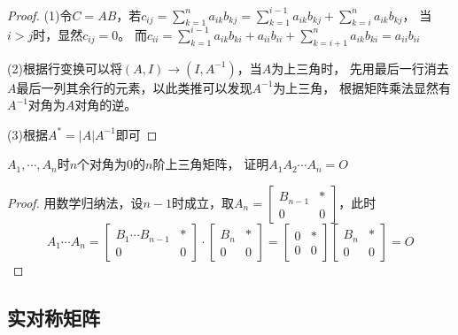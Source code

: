 \begin{proof}
  (1)令$C = AB$，若$c_{ij} = \sum\limits_{k = 1}^n a_{ik}b_{kj} = \sum\limits_{k = 1}^{i-1}a_{ik}b_{kj} + \sum\limits_{k = i}^n a_{ik}b_{kj}$，
  当$i > j$时，显然$c_{ij} = 0$。
  而$c_{ii} = \sum\limits_{k = 1}^{i-1}a_{ik}b_{ki} + a_{ii}b_{ii} + \sum\limits_{k = i+1}^na_{ik}b_{ki} = a_{ii}b_{ii}$

  (2)根据行变换可以将$(A,I) \rightarrow (I,A^{-1})$，当$A$为上三角时，
  先用最后一行消去$A$最后一列其余行的元素，以此类推可以发现$A^{-1}$为上三角，
  根据矩阵乘法显然有$A^{-1}$对角为$A$对角的逆。

  (3)根据$A^{\ast} = |A| A^{-1}$即可
\end{proof}

\begin{theorem}[n个上三角矩阵的乘积]
  $A_1,\cdots,A_n$时$n$个对角为$0$的$n$阶上三角矩阵，
  证明$A_1A_2\cdots A_n = O$
\end{theorem}

\begin{proof}
  用数学归纳法，设$n-1$时成立，取$A_n = \left[
    \begin{array}{cc}
      B_{n-1}&*\\
      0&0
    \end{array}
  \right]$，此时
  \begin{equation*}
    A_1\cdots A_n = \left[
      \begin{array}{cc}
        B_1\cdots B_{n-1}&*\\
        0&0
      \end{array}
    \right] \cdot \left[
      \begin{array}{cc}
        B_n&*\\
        0&0
      \end{array}
    \right] = \left[
      \begin{array}{cc}
        0&*\\
        0&0
      \end{array}
    \right] \left[
      \begin{array}{cc}
        B_n&*\\
        0&0
      \end{array}
    \right] = O
  \end{equation*}
\end{proof}


\subsection{实对称矩阵}

